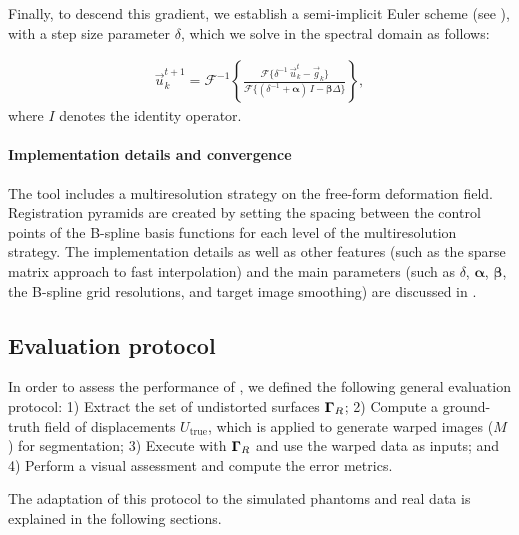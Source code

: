 Finally, to descend this gradient, we establish a semi-implicit Euler scheme (see ),
  with a step size parameter $\delta$, which we solve in the spectral domain as follows:

  \begin{align}
  \vec{u}_k^{t+1} = \mathcal{F}^{-1}\left\{ \frac{\mathcal{F}\{\delta^{-1} \, \vec{u}_k^t - \vec{g}_k\} }
                    {\mathcal{F}\{(\delta^{-1} + \boldsymbol{\alpha})\, I - \boldsymbol{\beta}\Delta\}} \right\},
  \label{eq:update_equation}
  \end{align}
  where $I$ denotes the identity operator.


\paragraph*{Implementation details and convergence}
\label{sec:conv_report}
The \regseg{} tool includes a multiresolution strategy on the free-form deformation field.
Registration pyramids are created by setting the spacing between the control points of the B-spline basis
  functions for each level of the multiresolution strategy.
The implementation details as well as other features (such as the sparse matrix approach
  to fast interpolation) and the main parameters
  (such as $\delta$, $\boldsymbol{\alpha}$, $\boldsymbol{\beta}$, the B-spline grid resolutions,
  and target image smoothing) are discussed in .

\subsection{Evaluation protocol}\label{sec:evaluation_protocol}
In order to assess the performance of \regseg{}, we defined the following general
  evaluation protocol:
1) Extract the set of undistorted surfaces $\boldsymbol{\Gamma}_R$;
2) Compute a ground-truth field of displacements $U_\text{true}$, which is applied to
  generate warped images ($M$) for segmentation;
3) Execute \regseg{} with $\boldsymbol{\Gamma}_R$ and use the warped data as inputs; and
4) Perform a visual assessment and compute the error metrics.

The adaptation of this protocol to the simulated phantoms and real data is explained in the
  following sections.

